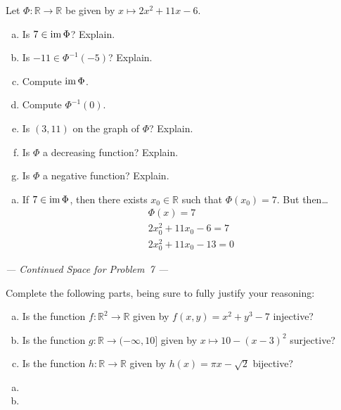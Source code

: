 \documentclass[12pt,letterpaper]{exam}
\begin{document}
\begin{questions}
\newpage
\question[10] Let $\Phi \colon \mathbb{R} \to \mathbb{R}$ be given by $x \mapsto 2x^2 + 11x - 6$. 
	\begin{enumerate}[(a)]
	\item Is $7 \in \operatorname{im} \Phi$? Explain. 
	\item Is $-11 \in \Phi^{-1}(-5)$? Explain. 
	\item Compute $\operatorname{im} \Phi$.
	\item Compute $\Phi^{-1}(0)$. 
	\item Is $(3, 11)$ on the graph of $\Phi$? Explain. 
	\item Is $\Phi$ a decreasing function? Explain.  
	\item Is $\Phi$ a negative function? Explain. 
	\end{enumerate} \pspace

\sol 
\begin{enumerate}[(a)]
\item If $7 \in \operatorname{im} \Phi$, then there exists $x_0 \in \mathbb{R}$ such that $\Phi(x_0)= 7$. But then\dots
	\[
	\begin{gathered}
	\Phi(x)= 7 \\
	2x_0^2 + 11x_0 - 6= 7 \\
	2x_0^2 + 11x_0 - 13= 0 
	\end{gathered}
	\]
\end{enumerate}

\newpage 
\begin{center} {\itshape --- Continued Space for Problem~7 ---} \end{center}
\newpage

	

\newpage
\question[10] Complete the following parts, being sure to fully justify your reasoning:
	\begin{enumerate}[(a)]
	\item Is the function $f: \mathbb{R}^2 \to \mathbb{R}$ given by $f(x, y)= x^2 + y^3 - 7$ injective?
	\item Is the function $g: \mathbb{R} \to (-\infty, 10]$ given by $x \mapsto 10 - (x - 3)^2$ surjective?
	\item Is the function $h: \mathbb{R} \to \mathbb{R}$ given by $h(x)= \pi x - \sqrt{2}$ bijective? 
	\end{enumerate} \pspace

\sol 
\begin{enumerate}[(a)]
\item 

\item 


\end{enumerate}
\end{questions}
\end{document}

